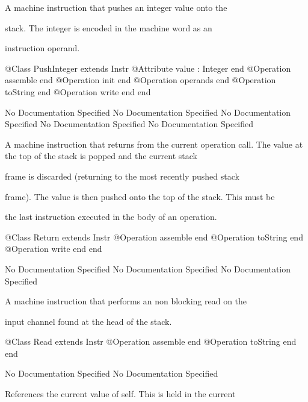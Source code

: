       A machine instruction that pushes an integer value onto the

      stack. The integer is encoded in the machine word as an

      instruction operand.
\begin{Interface}
@Class PushInteger extends Instr
  @Attribute value : Integer end
  @Operation assemble end
  @Operation init end
  @Operation operands end
  @Operation toString end
  @Operation write end
end
\end{Interface}
No Documentation Specified
No Documentation Specified
No Documentation Specified
No Documentation Specified
No Documentation Specified

      A machine instruction that returns from the current operation call.
      The value at the top of the stack is popped and the current stack

      frame is discarded (returning to the most recently pushed stack

      frame). The value is then pushed onto the top of the stack. This must be

      the last instruction executed in the body of an operation.
\begin{Interface}
@Class Return extends Instr
  @Operation assemble end
  @Operation toString end
  @Operation write end
end
\end{Interface}
No Documentation Specified
No Documentation Specified
No Documentation Specified

      A machine instruction that performs an non blocking read on the

      input channel found at the head of the stack.
\begin{Interface}
@Class Read extends Instr
  @Operation assemble end
  @Operation toString end
end
\end{Interface}
No Documentation Specified
No Documentation Specified

      References the current value of self. This is held in the current

